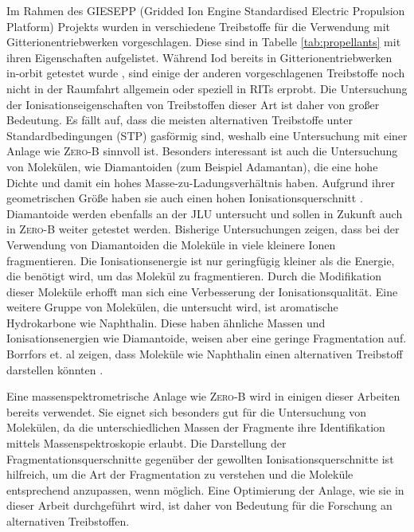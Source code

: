Im Rahmen des GIESEPP (Gridded Ion Engine Standardised Electric Propulsion Platform) Projekts wurden in \cite{Prop} verschiedene Treibstoffe für die Verwendung mit Gitterionentriebwerken vorgeschlagen. Diese sind in Tabelle \ref{tab:propellants} mit ihren Eigenschaften aufgelistet. Während Iod bereits in Gitterionentriebwerken in-orbit getestet wurde \cite{Iodine}, sind einige der anderen vorgeschlagenen Treibstoffe noch nicht in der Raumfahrt allgemein oder speziell in RITs erprobt. Die Untersuchung der Ionisationseigenschaften von Treibstoffen dieser Art ist daher von großer Bedeutung. Es fällt auf, dass die meisten alternativen Treibstoffe unter Standardbedingungen (STP) gasförmig sind, weshalb eine Untersuchung mit einer Anlage wie \textsc{Zero-B} sinnvoll ist. Besonders interessant ist auch die Untersuchung von Molekülen, wie Diamantoiden (zum Beispiel Adamantan), die eine hohe Dichte und damit ein hohes Masse-zu-Ladungsverhältnis haben. Aufgrund ihrer geometrischen Größe haben sie auch einen hohen Ionisationsquerschnitt \cite{ion}. Diamantoide werden ebenfalls an der JLU untersucht \cite{diamondoids} und sollen in Zukunft auch in \textsc{Zero-B} weiter getestet werden. Bisherige Untersuchungen zeigen, dass bei der Verwendung von Diamantoiden die Moleküle in viele kleinere Ionen fragmentieren. Die Ionisationsenergie ist nur geringfügig kleiner als die Energie, die benötigt wird, um das Molekül zu fragmentieren. Durch die Modifikation dieser Moleküle erhofft man sich eine Verbesserung der Ionisationsqualität. Eine weitere Gruppe von Molekülen, die untersucht wird, ist aromatische Hydrokarbone wie Naphthalin. Diese haben ähnliche Massen und Ionisationsenergien wie Diamantoide, weisen aber eine geringe Fragmentation auf. Borrfors et. al zeigen, dass Moleküle wie Naphthalin einen alternativen Treibstoff darstellen könnten \cite{hydrocarbons}.

Eine massenspektrometrische Anlage wie \textsc{Zero-B} wird in einigen dieser Arbeiten bereits verwendet. Sie eignet sich besonders gut für die Untersuchung von Molekülen, da die unterschiedlichen Massen der Fragmente ihre Identifikation mittels Massenspektroskopie erlaubt. Die Darstellung der Fragmentationsquerschnitte gegenüber der gewollten Ionisationsquerschnitte ist hilfreich, um die Art der Fragmentation zu verstehen und die Moleküle entsprechend anzupassen, wenn möglich. Eine Optimierung der Anlage, wie sie in dieser Arbeit durchgeführt wird, ist daher von Bedeutung für die Forschung an alternativen Treibstoffen.

